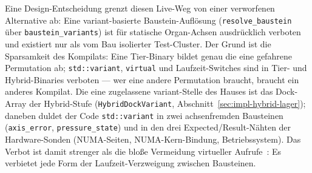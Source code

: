 \begin{nurkurz}
Eine Design-Entscheidung grenzt diesen Live-Weg von einer verworfenen Alternative ab: Eine variant-basierte
Baustein-Auflösung (\texttt{resolve\_baustein} über \texttt{baustein\_variants}) ist für statische
Organ-Achsen ausdrücklich verboten und existiert nur als vom Bau isolierter Test-Cluster. Der Grund ist die
Sparsamkeit des Kompilats: Eine Tier-Binary bildet genau die eine gefahrene Permutation ab;
\texttt{std::variant}, \texttt{virtual} und Laufzeit-Switches sind in Tier- und Hybrid-Binaries verboten
--- wer eine andere Permutation braucht, braucht ein anderes Kompilat. Die eine zugelassene variant-Stelle
des Hauses ist das Dock-Array der Hybrid-Stufe (\texttt{HybridDockVariant},
Abschnitt~\ref{sec:impl-hybrid-lager}); daneben duldet der Code \texttt{std::variant} in zwei achsenfremden
Bausteinen (\texttt{axis\_error}, \texttt{pressure\_state}) und in den drei Expected/Result-Nähten der
Hardware-Sonden (NUMA-Seiten, NUMA-Kern-Bindung, Betriebssystem). Das Verbot ist damit strenger als die
bloße Vermeidung virtueller Aufrufe~\cite{alexandrescu2001modern}: Es verbietet jede Form der
Laufzeit-Verzweigung zwischen Bausteinen.
\end{nurkurz}

